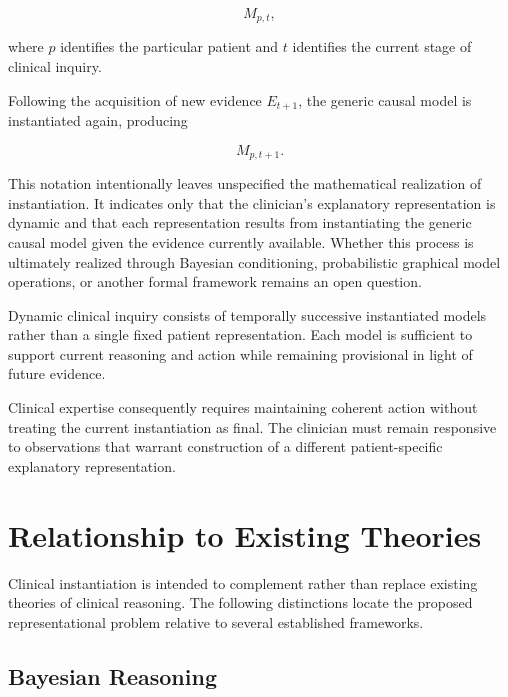 \documentclass[11pt]{article}
\begin{document}
\[
M_{p,t},
\]

where $p$ identifies the particular patient and $t$ identifies the current stage of clinical inquiry.

Following the acquisition of new evidence $E_{t+1}$, the generic causal model is instantiated again, producing

\[
M_{p,t+1}.
\]

This notation intentionally leaves unspecified the mathematical realization of instantiation. It indicates only that the clinician's explanatory representation is dynamic and that each representation results from instantiating the generic causal model given the evidence currently available. Whether this process is ultimately realized through Bayesian conditioning, probabilistic graphical model operations, or another formal framework remains an open question.

Dynamic clinical inquiry consists of temporally successive instantiated models rather than a single fixed patient representation. Each model is sufficient to support current reasoning and action while remaining provisional in light of future evidence.

Clinical expertise consequently requires maintaining coherent action without treating the current instantiation as final. The clinician must remain responsive to observations that warrant construction of a different patient-specific explanatory representation.

\section{Relationship to Existing Theories}

Clinical instantiation is intended to complement rather than replace existing theories of clinical reasoning. The following distinctions locate the proposed representational problem relative to several established frameworks.

\subsection{Bayesian Reasoning}
\end{document}
